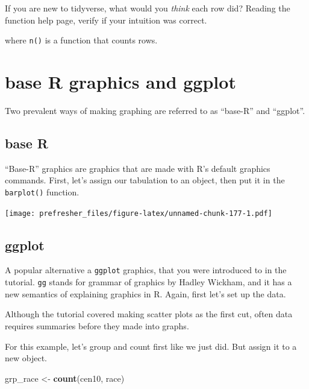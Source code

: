 \documentclass[]{book}
\newenvironment{Shaded}{\begin{snugshade}}{\end{snugshade}}
\newcommand{\KeywordTok}[1]{\textcolor[rgb]{0.13,0.29,0.53}{\textbf{#1}}}
\newcommand{\StringTok}[1]{\textcolor[rgb]{0.31,0.60,0.02}{#1}}
\newcommand{\OperatorTok}[1]{\textcolor[rgb]{0.81,0.36,0.00}{\textbf{#1}}}
\newcommand{\NormalTok}[1]{#1}
\theoremstyle{definition}
\theoremstyle{definition}
\theoremstyle{definition}
\theoremstyle{remark}
\begin{document}
If you are new to tidyverse, what would you \emph{think} each row did?
Reading the function help page, verify if your intuition was correct.

where \texttt{n()} is a function that counts rows.

\section{base R graphics and ggplot}\label{base-r-graphics-and-ggplot}

Two prevalent ways of making graphing are referred to as ``base-R'' and
``ggplot''.

\subsection{base R}\label{base-r}

``Base-R'' graphics are graphics that are made with R's default graphics
commands. First, let's assign our tabulation to an object, then put it
in the \texttt{barplot()} function.

\begin{Shaded}
\end{Shaded}

\texttt{[image: prefresher\_files/figure-latex/unnamed-chunk-177-1.pdf]}

\subsection{ggplot}\label{ggplot}

A popular alternative a \texttt{ggplot} graphics, that you were
introduced to in the tutorial. \texttt{gg} stands for grammar of
graphics by Hadley Wickham, and it has a new semantics of explaining
graphics in R. Again, first let's set up the data.

Although the tutorial covered making scatter plots as the first cut,
often data requires summaries before they made into graphs.

For this example, let's group and count first like we just did. But
assign it to a new object.

\begin{Shaded}
\begin{Highlighting}[]
\NormalTok{grp_race <-}\StringTok{ }\KeywordTok{count}\NormalTok{(cen10, race)}
\end{Highlighting}
\end{Shaded}
\end{document}
